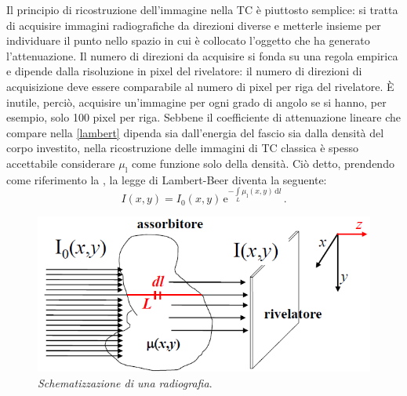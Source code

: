 Il principio di ricostruzione dell'immagine nella TC è piuttosto semplice: si tratta di acquisire immagini radiografiche da direzioni diverse e metterle insieme per individuare il punto nello spazio in cui è collocato l'oggetto che ha generato l'attenuazione. Il numero di direzioni da acquisire si fonda su una regola empirica e dipende dalla risoluzione in pixel del rivelatore: il numero di direzioni di acquisizione deve essere comparabile al numero di pixel per riga del rivelatore. È inutile, perciò, acquisire un'immagine per ogni grado di angolo se si hanno, per esempio, solo 100 pixel per riga. Sebbene il coefficiente di attenuazione lineare che compare nella \eqref{lambert} dipenda sia dall'energia del fascio sia dalla densità del corpo investito, nella ricostruzione delle immagini di TC classica è spesso accettabile considerare $\mu_\mathrm{l}$ come funzione solo della densità. Ciò detto, prendendo come riferimento la , la legge di Lambert-Beer diventa la seguente:
\begin{equation}
    I(x,y) = I_0(x,y)\,\mathrm{e}^{-\int\limits_L \mu_\mathrm{l} (x,y)\,\mathrm{d}l}\,.
\end{equation}

\begin{figure}[htp]
\centering
\includegraphics[scale=0.85]{Immagini/attenuazione.png}
\caption{\label{fig:attenuazione} \textit{Schematizzazione di una radiografia}.}
\end{figure}

